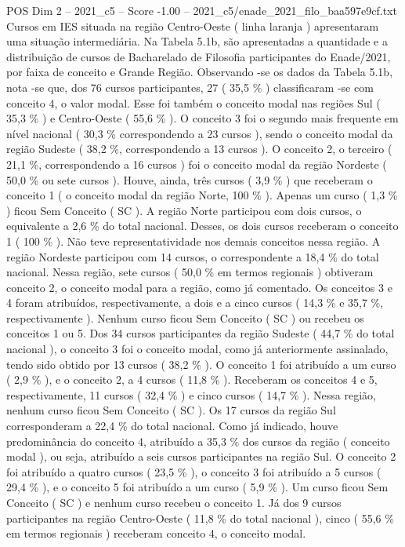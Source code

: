 \begin{textsample}{POS Dim 2 – 2021\_c5 – Score -1.00 – 2021\_c5/enade\_2021\_filo\_baa597e9cf.txt}
Cursos em IES situada na região Centro-Oeste ( linha laranja ) apresentaram uma situação intermediária.
Na Tabela 5.1b, são apresentadas a quantidade e a distribuição de cursos de Bacharelado de Filosofia participantes do Enade/2021, por faixa de conceito e Grande Região.
Observando -se os dados da Tabela 5.1b, nota -se que, dos 76 cursos participantes, 27 ( 35,5 \% ) classificaram -se com conceito 4, o valor modal.
Esse foi também o conceito modal nas regiões Sul ( 35,3 \% ) e Centro-Oeste ( 55,6 \% ).
O conceito 3 foi o segundo mais frequente em nível nacional ( 30,3 \% correspondendo a 23 cursos ), sendo o conceito modal da região Sudeste ( 38,2 \%, correspondendo a 13 cursos ).
O conceito 2, o terceiro ( 21,1 \%, correspondendo a 16 cursos ) foi o conceito modal da região Nordeste ( 50,0 \% ou sete cursos ).
Houve, ainda, três cursos ( 3,9 \% ) que receberam o conceito 1 ( o conceito modal da região Norte, 100 \% ).
Apenas um curso ( 1,3 \% ) ficou Sem Conceito ( SC ).
A região Norte participou com dois cursos, o equivalente a 2,6 \% do total nacional.
Desses, os dois cursos receberam o conceito 1 ( 100 \% ).
Não teve representatividade nos demais conceitos nessa região.
A região Nordeste participou com 14 cursos, o correspondente a 18,4 \% do total nacional.
Nessa região, sete cursos ( 50,0 \% em termos regionais ) obtiveram conceito 2, o conceito modal para a região, como já comentado.
Os conceitos 3 e 4 foram atribuídos, respectivamente, a dois e a cinco cursos ( 14,3 \% e 35,7 \%, respectivamente ).
Nenhum curso ficou Sem Conceito ( SC ) ou recebeu os conceitos 1 ou 5.
Dos 34 cursos participantes da região Sudeste ( 44,7 \% do total nacional ), o conceito 3 foi o conceito modal, como já anteriormente assinalado, tendo sido obtido por 13 cursos ( 38,2 \% ).
O conceito 1 foi atribuído a um curso ( 2,9 \% ), e o conceito 2, a 4 cursos ( 11,8 \% ).
Receberam os conceitos 4 e 5, respectivamente, 11 cursos ( 32,4 \% ) e cinco cursos ( 14,7 \% ).
Nessa região, nenhum curso ficou Sem Conceito ( SC ).
Os 17 cursos da região Sul corresponderam a 22,4 \% do total nacional.
Como já indicado, houve predominância do conceito 4, atribuído a 35,3 \% dos cursos da região ( conceito modal ), ou seja, atribuído a seis cursos participantes na região Sul.
O conceito 2 foi atribuído a quatro cursos ( 23,5 \% ), o conceito 3 foi atribuído a 5 cursos ( 29,4 \% ), e o conceito 5 foi atribuído a um curso ( 5,9 \% ).
Um curso ficou Sem Conceito ( SC ) e nenhum curso recebeu o conceito 1.
Já dos 9 cursos participantes na região Centro-Oeste ( 11,8 \% do total nacional ), cinco ( 55,6 \% em termos regionais ) receberam conceito 4, o conceito modal.

\end{textsample}

